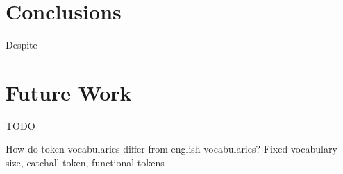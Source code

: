 \documentclass[11pt]{article}
\begin{document}
\section{Conclusions}

Despite 


\section{Future Work}

TODO

How do token vocabularies differ from english vocabularies? Fixed vocabulary size, catchall token, functional tokens

%




\end{document}
